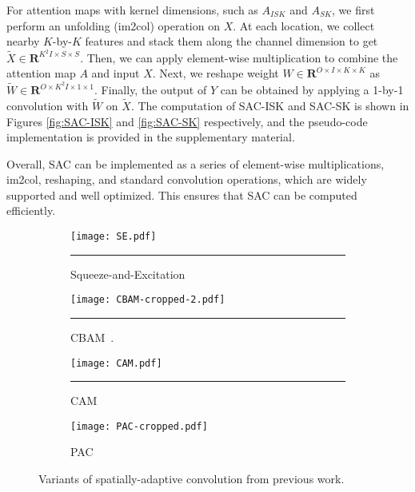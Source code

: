 \documentclass[runningheads]{llncs}
\begin{document}
For attention maps with kernel dimensions, such as $A_{ISK}$ and $A_{SK}$, we first perform an unfolding (im2col) operation on $X$. At each location, we collect nearby $K$-by-$K$ features and stack them along the channel dimension to get $\tilde{X} \in \mathbf{R}^{K^2I \times S \times S}$. Then, we can apply element-wise multiplication to combine the attention map $A$ and input $X$. Next, we reshape weight $W \in \mathbf{R}^{O\times I\times K\times K}$ as $\tilde{W} \in \mathbf{R}^{O \times K^2I \times 1 \times 1}$. Finally, the output of $Y$ can be obtained by applying a 1-by-1 convolution with $\tilde{W}$ on $\tilde{X}$. The computation of SAC-ISK and SAC-SK is shown in Figures \ref{fig:SAC-ISK} and \ref{fig:SAC-SK} respectively, and the pseudo-code implementation is provided in the supplementary material. 


Overall, SAC can be implemented as a series of element-wise multiplications, im2col, reshaping, and standard convolution operations, which are widely supported and well optimized. This ensures that SAC can be computed efficiently. 


\begin{figure}[t!]
     \centering
     \begin{subfigure}[b]{0.75\textwidth}
         \centering
         \texttt{[image: SE.pdf]}
         \caption{ Squeeze-and-Excitation~\cite{hu2018squeeze}}
         \hrule
         \label{fig:SE}
     \end{subfigure}
     \hfill
          \begin{subfigure}[b]{0.75\textwidth}
         \centering
         \texttt{[image: CBAM-cropped-2.pdf]}
         \caption{CBAM~\cite{woo2018cbam}.}
         \hrule
         \label{fig:CBAM}
     \end{subfigure}
          \hfill
          \begin{subfigure}[b]{0.75\textwidth}
         \centering
         \texttt{[image: CAM.pdf]}
         \caption{CAM~\cite{wu2018squeezesegv2}}
         \hrule
         \label{fig:CAM}
     \end{subfigure}
               \hfill
          \begin{subfigure}[b]{0.75\textwidth}
         \centering
         \texttt{[image: PAC-cropped.pdf]}
         \caption{PAC~\cite{su2019pixel}}
         \label{fig:PAC}
     \end{subfigure}
     \hfill
     
    \caption{Variants of spatially-adaptive convolution from previous work.}
    \label{fig:others}
\end{figure}
\end{document}
